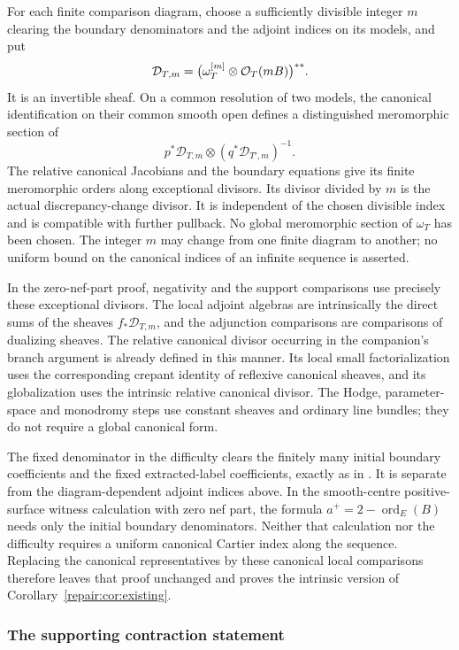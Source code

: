 For each finite comparison diagram, choose a sufficiently divisible
integer $m$ clearing the boundary denominators and the adjoint indices
on its models, and put
\[
 \mathcal D_{T,m}
   =\bigl(\omega_T^{[m]}\otimes\mathcal O_T(mB)\bigr)^{**}.
\]
It is an invertible sheaf. On a common resolution of two models, the
canonical identification on their common smooth open defines a
distinguished meromorphic section of
\[
 p^*\mathcal D_{T,m}\otimes(q^*\mathcal D_{T',m})^{-1}.
\]
The relative canonical Jacobians and the boundary equations give its
finite meromorphic orders along exceptional divisors. Its divisor
divided by $m$ is the actual discrepancy-change divisor. It is
independent of the chosen divisible index and is compatible with
further pullback. No global meromorphic section of $\omega_T$ has
been chosen. The integer $m$ may change from one finite diagram to
another; no uniform bound on the canonical indices of an infinite
sequence is asserted.

In the zero-nef-part proof, negativity and the support comparisons
use precisely these exceptional divisors. The local adjoint algebras
are intrinsically the direct sums of the sheaves
$f_*\mathcal D_{T,m}$, and the adjunction comparisons are comparisons
of dualizing sheaves. The relative canonical divisor occurring in the
companion's branch argument is already defined in this manner.
Its local small factorialization uses the corresponding crepant
identity of reflexive canonical sheaves, and its globalization uses
the intrinsic relative canonical divisor. The Hodge, parameter-space
and monodromy steps use constant sheaves and ordinary line bundles;
they do not require a global canonical form.

The fixed denominator in the difficulty clears the finitely
many initial boundary coefficients and the fixed extracted-label
coefficients, exactly as in \cite{OAI:Termination-of-generalized-log-canonical-flips-on-compact-Kahler-fourfolds-October-7-2026}. It is separate from the
diagram-dependent adjoint indices above. In the smooth-centre
positive-surface witness calculation with zero nef part, the formula
$a^+=2-\operatorname{ord}_E(B)$ needs only the initial boundary
denominators. Neither that calculation nor the difficulty
requires a uniform canonical Cartier index along the sequence.
Replacing the canonical representatives by these canonical local
comparisons therefore leaves that proof unchanged and proves the
intrinsic version of Corollary~\ref{repair:cor:existing}.

\subsubsection{The supporting contraction statement}

